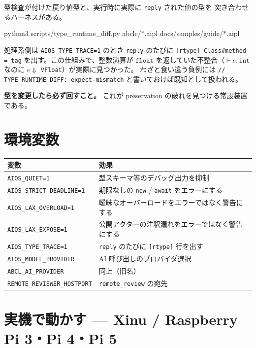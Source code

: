 \documentclass[11pt,a4paper]{ltjsarticle}
\newcommand{\ty}[1]{\ensuremath{\mathtt{#1}}}
\begin{document}
型検査が付けた戻り値型と、実行時に実際に \texttt{reply} された値の型を
突き合わせるハーネスがある。

\begin{term}
python3 scripts/type_runtime_diff.py abclc/*.aipl docs/samples/guide/*.aipl
\end{term}

処理系側は \texttt{AIOS\_TYPE\_TRACE=1} のとき \texttt{reply} のたびに
\texttt{[rtype] Class\#method = tag} を出す。この仕組みで、整数演算が
\ty{float} を返していた不整合（$\vdash e : \ty{int}$ なのに
$e \Downarrow$ \texttt{VFloat}）が実際に見つかった。
わざと食い違う負例には
\texttt{// TYPE\_RUNTIME\_DIFF: expect-mismatch} と書いておけば既知として扱われる。

\textbf{型を変更したら必ず回すこと。} これが preservation の破れを見つける常設装置である。

\section{環境変数}

\begin{center}
\begin{tabular}{@{}ll@{}}
\toprule
変数 & 効果 \\
\midrule
\texttt{AIOS\_QUIET=1}            & 型スキーマ等のデバッグ出力を抑制 \\
\texttt{AIOS\_STRICT\_DEADLINE=1} & 期限なしの \texttt{now} / \texttt{await} をエラーにする \\
\texttt{AIOS\_LAX\_OVERLOAD=1}    & 曖昧なオーバーロードをエラーではなく警告にする \\
\texttt{AIOS\_LAX\_EXPOSE=1}      & 公開アクターの注釈漏れをエラーではなく警告にする \\
\texttt{AIOS\_TYPE\_TRACE=1}      & \texttt{reply} のたびに \texttt{[rtype]} 行を出す \\
\texttt{AIOS\_MODEL\_PROVIDER}    & AI 呼び出しのプロバイダ選択 \\
\texttt{ABCL\_AI\_PROVIDER}       & 同上（旧名） \\
\texttt{REMOTE\_REVIEWER\_HOSTPORT} & \texttt{remote\_review} の宛先 \\
\bottomrule
\end{tabular}
\end{center}

\section{実機で動かす --- Xinu / Raspberry Pi 3・Pi 4・Pi 5}
\label{sec:xinu}
\end{document}
